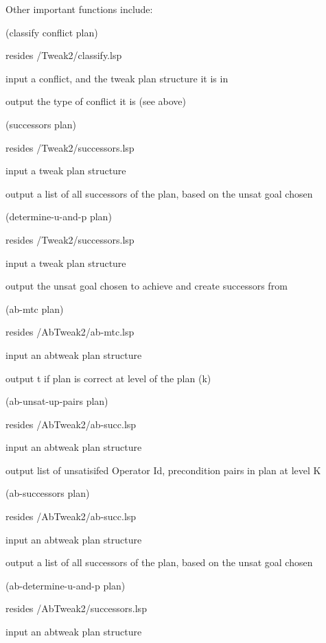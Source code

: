 \begin{description}
Other important functions include:

\item[CLASSIFY]
 (classify conflict plan)

 resides /Tweak2/classify.lsp

 input  a conflict, and the tweak plan structure it is in

 output the type of conflict it is (see above)

\item[SUCCESSORS]
 (successors plan)

 resides /Tweak2/successors.lsp

 input   a tweak  plan structure

 output  a list of all successors of the plan, based on the unsat goal chosen

\item[DETERMINE-U-AND-P] 
(determine-u-and-p plan)

 resides /Tweak2/successors.lsp

 input   a tweak  plan structure

 output  the unsat goal chosen to achieve and create successors from

\item[AB-MTC ](ab-mtc plan)

 resides /AbTweak2/ab-mtc.lsp

 input   an abtweak  plan structure

 output  t if plan is correct at level of the plan (k)

\item[AB-UNSAT-UP-PAIRS]
 (ab-unsat-up-pairs plan)

 resides /AbTweak2/ab-succ.lsp

 input   an abtweak  plan structure

 output  list of unsatisifed Operator Id, precondition pairs in plan at level K

\item[SUCCESSORS]
 (ab-successors plan)

 resides /AbTweak2/ab-succ.lsp

 input   an abtweak  plan structure

 output  a list of all successors of the plan, based on the unsat goal chosen

\item[AB-DETERMINE-U-AND-P]
(ab-determine-u-and-p plan)

 resides /AbTweak2/successors.lsp

 input   an abtweak  plan structure


\end{description}
